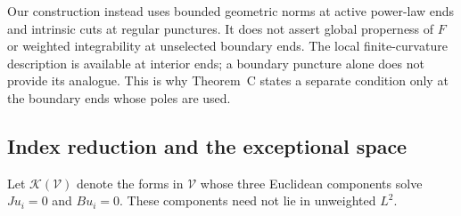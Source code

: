 \documentclass[11pt]{amsart}
\numberwithin{equation}{section}
\theoremstyle{definition}
\theoremstyle{remark}
\newcommand{\KK}{\mathcal K}
\begin{document}
Our construction instead uses bounded geometric norms at active power-law ends and intrinsic cuts at regular punctures. It does not assert global properness of $F$ or weighted integrability at unselected boundary ends. The local finite-curvature description is available at interior ends; a boundary puncture alone does not provide its analogue. This is why Theorem~C states a separate condition only at the boundary ends whose poles are used.

\subsection{Index reduction and the exceptional space}
Let $\KK(\mathcal V)$ denote the forms in $\mathcal V$ whose three Euclidean components solve $Ju_i=0$ and $Bu_i=0$. These components need not lie in unweighted $L^2$.
\end{document}

